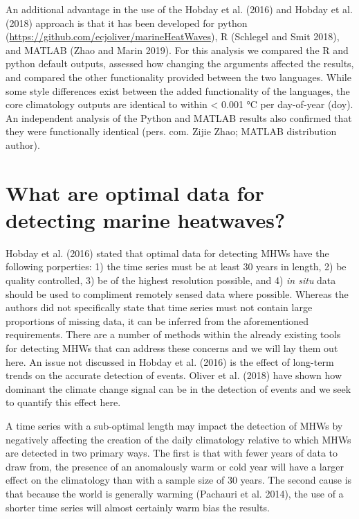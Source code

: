 \documentclass[]{article}
\begin{document}
An additional advantage in the use of the Hobday et al. (2016) and
Hobday et al. (2018) approach is that it has been developed for python
(\url{https://github.com/ecjoliver/marineHeatWaves}), R (Schlegel and
Smit 2018), and MATLAB (Zhao and Marin 2019). For this analysis we
compared the R and python default outputs, assessed how changing the
arguments affected the results, and compared the other functionality
provided between the two languages. While some style differences exist
between the added functionality of the languages, the core climatology
outputs are identical to within \textless{} 0.001 °C per day-of-year
(doy). An independent analysis of the Python and MATLAB results also
confirmed that they were functionally identical (pers. com. Zijie Zhao;
MATLAB distribution author).

\hypertarget{what-are-optimal-data-for-detecting-marine-heatwaves}{%
\section{What are optimal data for detecting marine
heatwaves?}\label{what-are-optimal-data-for-detecting-marine-heatwaves}}

Hobday et al. (2016) stated that optimal data for detecting MHWs have
the following porperties: 1) the time series must be at least 30 years
in length, 2) be quality controlled, 3) be of the highest resolution
possible, and 4) \emph{in situ} data should be used to compliment
remotely sensed data where possible. Whereas the authors did not
specifically state that time series must not contain large proportions
of missing data, it can be inferred from the aforementioned
requirements. There are a number of methods within the already existing
tools for detecting MHWs that can address these concerns and we will lay
them out here. An issue not discussed in Hobday et al. (2016) is the
effect of long-term trends on the accurate detection of events. Oliver
et al. (2018) have shown how dominant the climate change signal can be
in the detection of events and we seek to quantify this effect here.

A time series with a sub-optimal length may impact the detection of MHWs
by negatively affecting the creation of the daily climatology relative
to which MHWs are detected in two primary ways. The first is that with
fewer years of data to draw from, the presence of an anomalously warm or
cold year will have a larger effect on the climatology than with a
sample size of 30 years. The second cause is that because the world is
generally warming (Pachauri et al. 2014), the use of a shorter time
series will almost certainly warm bias the results.
\end{document}
